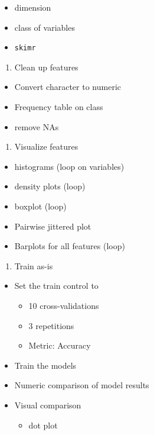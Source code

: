 \documentclass[]{book}
\providecommand{\tightlist}{%
  \setlength{\itemsep}{0pt}\setlength{\parskip}{0pt}}
\begin{document}
\begin{itemize}
\tightlist
\item
  dimension
\item
  class of variables
\item
  \texttt{skimr}
\end{itemize}

\begin{enumerate}
\def\labelenumi{\arabic{enumi}.}
\setcounter{enumi}{3}
\tightlist
\item
  Clean up features
\end{enumerate}

\begin{itemize}
\tightlist
\item
  Convert character to numeric
\item
  Frequency table on class
\item
  remove NAs
\end{itemize}

\begin{enumerate}
\def\labelenumi{\arabic{enumi}.}
\setcounter{enumi}{4}
\tightlist
\item
  Visualize features
\end{enumerate}

\begin{itemize}
\tightlist
\item
  histograms (loop on variables)
\item
  density plots (loop)
\item
  boxplot (loop)
\item
  Pairwise jittered plot
\item
  Barplots for all features (loop)
\end{itemize}

\begin{enumerate}
\def\labelenumi{\arabic{enumi}.}
\setcounter{enumi}{5}
\tightlist
\item
  Train as-is\\
\end{enumerate}

\begin{itemize}
\tightlist
\item
  Set the train control to

  \begin{itemize}
  \tightlist
  \item
    10 cross-validations
  \item
    3 repetitions
  \item
    Metric: Accuracy
  \end{itemize}
\item
  Train the models
\item
  Numeric comparison of model results
\item
  Visual comparison

  \begin{itemize}
  \tightlist
  \item
    dot plot
  \end{itemize}
\end{itemize}
\end{document}
